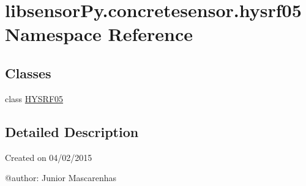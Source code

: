 \hypertarget{namespacelibsensorPy_1_1concretesensor_1_1hysrf05}{}\section{libsensor\+Py.\+concretesensor.\+hysrf05 Namespace Reference}
\label{namespacelibsensorPy_1_1concretesensor_1_1hysrf05}
\subsection*{Classes}
\begin{DoxyCompactItemize}
\item 
class \hyperlink{classlibsensorPy_1_1concretesensor_1_1hysrf05_1_1HYSRF05}{H\+Y\+S\+R\+F05}
\end{DoxyCompactItemize}


\subsection{Detailed Description}
\begin{DoxyVerb}Created on 04/02/2015

@author: Junior Mascarenhas
\end{DoxyVerb}
 